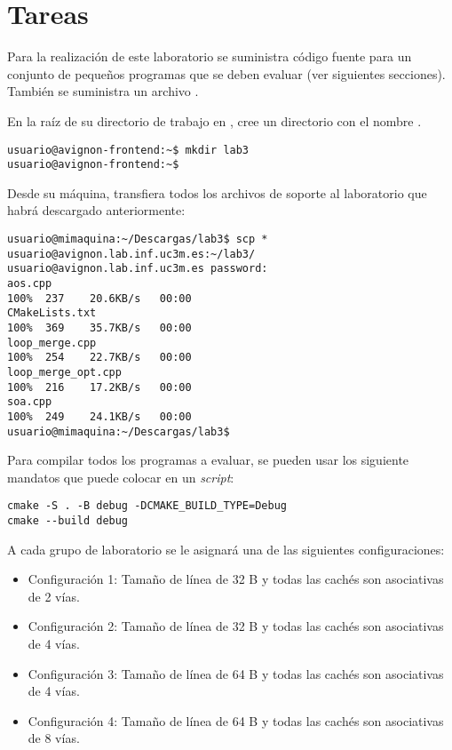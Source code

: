 \section{Tareas}

Para la realización de este laboratorio se suministra código fuente para un
conjunto de pequeños programas que se deben evaluar (ver siguientes secciones).
También se suministra un archivo .

En la raíz de su directorio de trabajo en , cree un
directorio con el nombre .

\begin{lstlisting}[style=terminal,aboveskip=1em,belowskip=1em]
usuario@avignon-frontend:~$ mkdir lab3
usuario@avignon-frontend:~$
\end{lstlisting}

Desde su máquina, transfiera todos los archivos de soporte al laboratorio
que habrá descargado anteriormente:

\begin{lstlisting}[style=terminal,aboveskip=1em,belowskip=1em]
usuario@mimaquina:~/Descargas/lab3$ scp * usuario@avignon.lab.inf.uc3m.es:~/lab3/
usuario@avignon.lab.inf.uc3m.es password: 
aos.cpp                                                            100%  237    20.6KB/s   00:00    
CMakeLists.txt                                                     100%  369    35.7KB/s   00:00    
loop_merge.cpp                                                     100%  254    22.7KB/s   00:00    
loop_merge_opt.cpp                                                 100%  216    17.2KB/s   00:00    
soa.cpp                                                            100%  249    24.1KB/s   00:00    
usuario@mimaquina:~/Descargas/lab3$ 
\end{lstlisting}

Para compilar todos los programas a evaluar, se pueden usar los siguiente mandatos
que puede colocar en un \emph{script}:

\begin{lstlisting}[style=terminal,aboveskip=1em,belowskip=1em]
cmake -S . -B debug -DCMAKE_BUILD_TYPE=Debug
cmake --build debug
\end{lstlisting}

A cada grupo de laboratorio se le asignará una de las siguientes configuraciones:
\begin{itemize}
\item Configuración 1:
Tamaño de línea de 32 B y todas las cachés son asociativas de 2 vías.
\item Configuración 2:
Tamaño de línea de 32 B y todas las cachés son asociativas de 4 vías.
\item Configuración 3:
Tamaño de línea de 64 B y todas las cachés son asociativas de 4 vías.
\item Configuración 4:
Tamaño de línea de 64 B y todas las cachés son asociativas de 8 vías.
\end{itemize}



